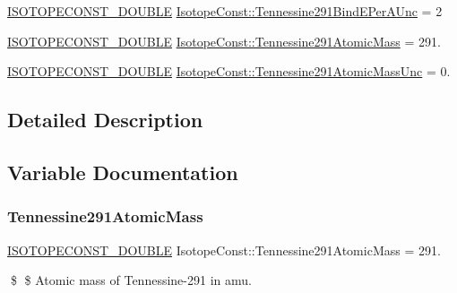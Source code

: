 \begin{DoxyCompactItemize}
\mbox{\hyperlink{group___isotope_const-_macros_ga8f45a7272ce02c0b4c65c44636ed719a}{I\+S\+O\+T\+O\+P\+E\+C\+O\+N\+S\+T\+\_\+\+D\+O\+U\+B\+LE}} \mbox{\hyperlink{group___isotope_const-_tennessine-_ts291_gaed63145481564faa9c851c44f3581a2a}{Isotope\+Const\+::\+Tennessine291\+Bind\+E\+Per\+A\+Unc}} = 2
\item 
\mbox{\hyperlink{group___isotope_const-_macros_ga8f45a7272ce02c0b4c65c44636ed719a}{I\+S\+O\+T\+O\+P\+E\+C\+O\+N\+S\+T\+\_\+\+D\+O\+U\+B\+LE}} \mbox{\hyperlink{group___isotope_const-_tennessine-_ts291_ga12acdf6b9e3b5536a9b53164c8ddc43f}{Isotope\+Const\+::\+Tennessine291\+Atomic\+Mass}} = 291.
\item 
\mbox{\hyperlink{group___isotope_const-_macros_ga8f45a7272ce02c0b4c65c44636ed719a}{I\+S\+O\+T\+O\+P\+E\+C\+O\+N\+S\+T\+\_\+\+D\+O\+U\+B\+LE}} \mbox{\hyperlink{group___isotope_const-_tennessine-_ts291_ga74f97dd01c36ed5c1eb8669597353479}{Isotope\+Const\+::\+Tennessine291\+Atomic\+Mass\+Unc}} = 0.
\end{DoxyCompactItemize}


\subsection{Detailed Description}


\subsection{Variable Documentation}
\mbox{\label{group___isotope_const-_tennessine-_ts291_ga12acdf6b9e3b5536a9b53164c8ddc43f}} 
\subsubsection{\texorpdfstring{Tennessine291\+Atomic\+Mass}{Tennessine291AtomicMass}}
{\footnotesize\ttfamily \mbox{\hyperlink{group___isotope_const-_macros_ga8f45a7272ce02c0b4c65c44636ed719a}{I\+S\+O\+T\+O\+P\+E\+C\+O\+N\+S\+T\+\_\+\+D\+O\+U\+B\+LE}} Isotope\+Const\+::\+Tennessine291\+Atomic\+Mass = 291.}

\$ \$ Atomic mass of Tennessine-\/291 in amu. \mbox{\label{group___isotope_const-_tennessine-_ts291_ga74f97dd01c36ed5c1eb8669597353479}} 
